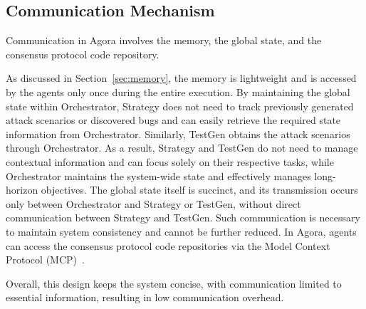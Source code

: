 \documentclass{article}
\theoremstyle{plain}
\theoremstyle{definition}
\theoremstyle{remark}
\newcommand{\consensustester}{Agora\xspace}
\newcommand{\agenta}{Orchestrator\xspace}
\newcommand{\agentb}{Strategy\xspace}
\newcommand{\agentc}{TestGen\xspace}
\begin{document}
\subsection{Communication Mechanism} 




Communication in \consensustester involves the memory, the global state, and the consensus protocol code repository.

As discussed in Section~\ref{sec:memory}, the memory is lightweight and is accessed by the agents only once during the entire execution. By maintaining the global state within \agenta, \agentb does not need to track previously generated attack scenarios or discovered bugs and can easily retrieve the required state information from \agenta. Similarly, \agentc obtains the attack scenarios through \agenta. As a result, \agentb and \agentc do not need to manage contextual information and can focus solely on their respective tasks, while \agenta maintains the system-wide state and effectively manages long-horizon objectives.
The global state itself is succinct, and its transmission occurs only between \agenta and \agentb or \agentc, without direct communication between \agentb and \agentc. Such communication is necessary to maintain system consistency and cannot be further reduced. In \consensustester, agents can access the consensus protocol code repositories via the Model Context Protocol (MCP)~\cite{anthropic2024mcp}.

Overall, this design keeps the system concise, with communication limited to essential information, resulting in low communication overhead.
\end{document}
